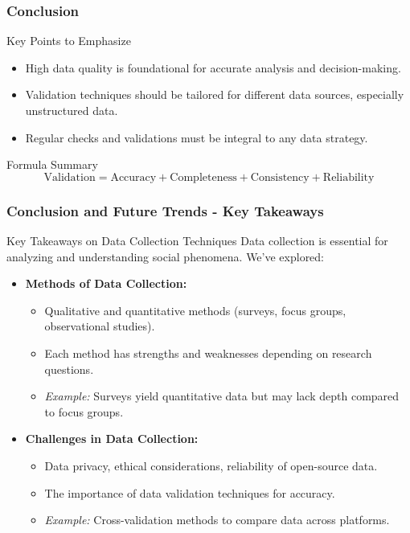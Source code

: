 \documentclass{beamer}
\begin{document}
\begin{frame}[fragile]
    \frametitle{Conclusion}
    \begin{block}{Key Points to Emphasize}
        \begin{itemize}
            \item High data quality is foundational for accurate analysis and decision-making.
            \item Validation techniques should be tailored for different data sources, especially unstructured data.
            \item Regular checks and validations must be integral to any data strategy.
        \end{itemize}
    \end{block}
    
    \begin{block}{Formula Summary}
        \[
        \text{Validation} = \text{Accuracy} + \text{Completeness} + \text{Consistency} + \text{Reliability}
        \]
    \end{block}
\end{frame}

\begin{frame}[fragile]
    \frametitle{Conclusion and Future Trends - Key Takeaways}
    \begin{block}{Key Takeaways on Data Collection Techniques}
        Data collection is essential for analyzing and understanding social phenomena. We’ve explored:
        \begin{itemize}
            \item \textbf{Methods of Data Collection:} 
                \begin{itemize}
                    \item Qualitative and quantitative methods (surveys, focus groups, observational studies).
                    \item Each method has strengths and weaknesses depending on research questions.
                    \item \textit{Example:} Surveys yield quantitative data but may lack depth compared to focus groups.
                \end{itemize}
            \item \textbf{Challenges in Data Collection:}
                \begin{itemize}
                    \item Data privacy, ethical considerations, reliability of open-source data.
                    \item The importance of data validation techniques for accuracy.
                    \item \textit{Example:} Cross-validation methods to compare data across platforms.
                \end{itemize}
        \end{itemize}
    \end{block}
\end{frame}
\end{document}
